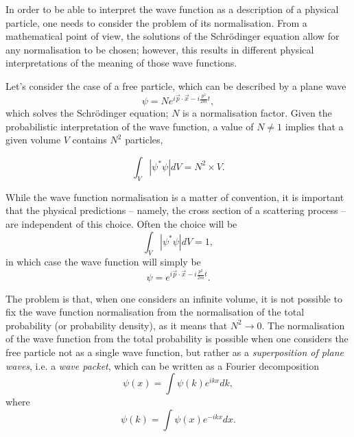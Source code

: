 In order to be able to interpret the wave function as a description of a physical particle, one needs to consider the problem of its normalisation. From a mathematical point of view, the solutions of the Schr\"odinger equation allow for any normalisation to be chosen; however, this results in different physical interpretations of the meaning of those wave functions.

Let's consider the case of a free particle, which can be described by a plane wave
    \begin{equation}
        \psi = Ne^{i\Vec{p}\cdot\Vec{x}-i\frac{p^2}{2m}t},
    \end{equation}
which solves the Schr\"odinger equation; $N$ is a normalisation factor. Given the probabilistic interpretation of the wave function, a value of \(N\neq1\) implies that a given volume $V$ contains $N^2$ particles,

\begin{equation}
    \int_V | \psi^* \psi| dV = N^2 \times V.
\end{equation}

While the wave function normalisation is a matter of convention, it is important that the physical predictions -- namely, the cross section of a scattering process -- are independent of this choice. Often the choice will be
\begin{equation*}
    \int_V | \psi^* \psi| dV = 1,
\end{equation*}
in which case the wave function will simply be
\begin{equation*}
    \psi = e^{i\Vec{p}\cdot\Vec{x}-i\frac{p^2}{2m}t}.
\end{equation*}

The problem is that, when one considers an infinite volume, it is not possible to fix the wave function normalisation from the normalisation of the total probability (or probability density),%
as it means that $N^2 \rightarrow 0$. The normalisation of the wave function from the total probability is possible when one considers the free particle not as a single wave function, but rather as a \emph{superposition of plane waves}, i.e. a \emph{wave packet}, which can be written as a Fourier decomposition
   \begin{equation}
        \psi(x) = \int \psi(k) e^{ikx} dk,
    \end{equation}
where
   \begin{equation}
        \psi(k) = \int \psi(x) e^{-ikx} dx.
    \end{equation}

